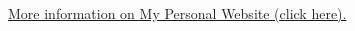 \documentclass[11pt,a4paper,sans]{moderncv} %
\begin{document}
\begin{multicols}{2}
\begin{itemize}
			
			

			
			
			
			
			
			
			
			
			
		\end{itemize}
	\end{multicols}
 \vspace{1em}
	\centerline{{{	\faGlobe  \hspace{0.5 pt} \href{https://mjahmadee.site123.me/\#section-5e8dce1492e0f}{More information on My Personal Website (click here).}}}}
\end{document}
